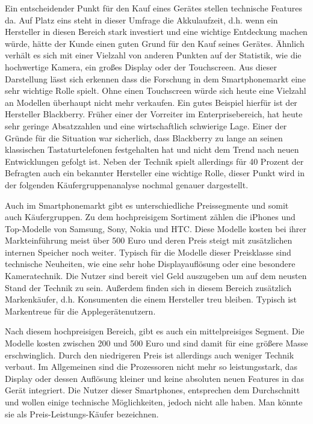 Ein entscheidender Punkt für den Kauf eines Gerätes stellen technische Features da. Auf Platz eins steht in dieser Umfrage die Akkulaufzeit, d.h. wenn ein Hersteller in diesen Bereich stark investiert und eine wichtige Entdeckung machen würde, hätte der Kunde einen guten Grund für den Kauf seines Gerätes. Ähnlich verhält es sich mit einer Vielzahl von anderen Punkten auf der Statistik, wie die hochwertige Kamera, ein großes Display oder der Touchscreen. Aus dieser Darstellung lässt sich erkennen dass die Forschung in dem Smartphonemarkt eine sehr wichtige Rolle spielt. Ohne einen Touchscreen würde sich heute eine Vielzahl an Modellen überhaupt nicht mehr verkaufen. Ein gutes Beispiel hierfür ist der Hersteller Blackberry. Früher einer der Vorreiter im Enterprisebereich, hat heute sehr geringe Absatzzahlen und eine wirtschaftlich schwierige Lage. Einer der Gründe für die Situation war sicherlich, dass Blackberry zu lange an seinen klassischen Tastaturtelefonen festgehalten hat und nicht dem Trend nach neuen Entwicklungen gefolgt ist. Neben der Technik  spielt allerdings für 40 Prozent der Befragten auch ein bekannter Hersteller eine wichtige Rolle, dieser Punkt wird in der folgenden Käufergruppenanalyse nochmal genauer dargestellt.

Auch im Smartphonemarkt gibt es unterschiedliche Preissegmente und somit auch Käufergruppen. Zu dem hochpreisigem Sortiment zählen die iPhones und Top-Modelle von Samsung, Sony, Nokia und HTC. Diese Modelle kosten bei ihrer Markteinführung meist über 500 Euro und deren Preis steigt mit zusätzlichen internen Speicher noch weiter. Typisch für die Modelle dieser Preisklasse sind technische Neuheiten, wie eine sehr hohe Displayauflösung oder eine besondere Kameratechnik. Die Nutzer sind bereit viel Geld auszugeben um auf dem neusten Stand der Technik zu sein. Außerdem finden sich in diesem Bereich zusätzlich Markenkäufer, d.h. Konsumenten die einem Hersteller treu bleiben. Typisch ist Markentreue für die Applegerätenutzern. 

Nach diesem hochpreisigen Bereich, gibt es auch ein mittelpreisiges Segment. Die Modelle kosten zwischen 200  und 500 Euro und  sind damit für eine größere Masse erschwinglich. Durch den niedrigeren Preis ist allerdings auch weniger Technik verbaut. Im Allgemeinen sind die Prozessoren nicht mehr so leistungsstark, das Display oder dessen Auflösung kleiner und keine absoluten neuen Features in das Gerät integriert. Die Nutzer dieser Smartphones, entsprechen dem Durchschnitt und wollen einige technische Möglichkeiten, jedoch nicht alle haben. Man könnte sie als Preis-Leistungs-Käufer bezeichnen.

